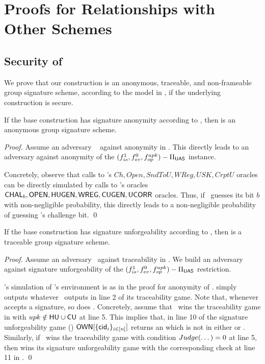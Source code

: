 \section{Proofs for Relationships with Other Schemes}
\label{app:related-proofs}

\subsection{Security of \CUASGS}

We prove that our \CUASGS construction is an anonymous, traceable, and
non-frameable group signature scheme, according to the model in \cite{bsz05}, if
the underlying \CUASGen construction is secure.

\begin{theorem}
  If the base \CUASGen construction has signature anonymity according to
  , then \CUASGS is an anonymous group
  signature scheme.
\end{theorem}

\begin{proof}
  Assume an adversary \adv~ against anonymity in \CUASGS. This directly leads
  to an adversary \advB against anonymity of the $(f_{is}^1,f_{ev}^0,
  f_{op}^{upk})-\Pi_{\mathsf{UAS}}$ instance.

  Concretely, observe that calls to \adv's $Ch,Open,SndToU,WReg,USK,CrptU$
  oracles can be directly simulated by calls to \advB's oracles $\mathsf{CHAL}_b,
  \mathsf{OPEN},\mathsf{HUGEN},\mathsf{WREG},\mathsf{CUGEN},\mathsf{UCORR}$ oracles. Thus, if \adv~guesses its bit $b$
  with non-negligible probability, this directly leads to a non-negligible
  probability of guessing \advB's challenge bit.
  \qed
\end{proof}

\begin{theorem}
  If the base \CUASGen construction has signature unforgeability according to
  , then \CUASGS is a traceable group signature
  scheme.
\end{theorem}

\begin{proof}
  Assume an adversary \adv~against traceability in \CUASGS. We build an
  adversary \advB against signature unforgeability of the $(f_{is}^1,f_{ev}^0,
  f_{op}^{upk})-\Pi_{\mathsf{UAS}}$ restriction.

  \advB's simulation of \adv's environment is as in the proof for anonymity
  of \CUASGS. \advB simply outputs whatever \adv~outputs in line 2 of its
  traceability game. Note that, whenever \CUASGS accepts a signature, so does
  \CUASGen. Concretely,
  assume that \adv~wins the traceability game in  with
  $upk \notin \mathsf{HU} \cup \mathsf{CU}$ at line 5. This implies that, in line 10 of the
  \UAS signature unforgeability game () $\mathsf{OWN}[\lbrace
  \mathsf{cid}_i\rbrace_{i\in[n]}]$ returns an \uid which is not in either \HU or \CU.
  Similarly, if \adv~wins the traceability game with condition $Judge(\dots)=0$
  at line 5, then \advB wins its signature unforgeability game with the
  corresponding check at line 11 in .
  \qed
\end{proof}

